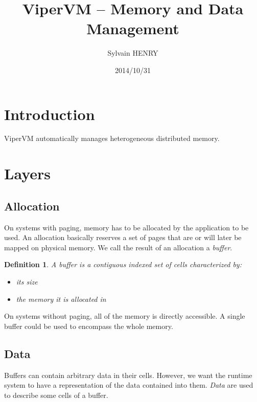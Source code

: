 \documentclass[twocolumn]{article}
\begin{document}
\title{ViperVM -- Memory and Data Management}
\author{Sylvain HENRY}
\date{2014/10/31}

\newtheorem{defin}{Definition}

\maketitle

\section{Introduction}

ViperVM automatically manages heterogeneous distributed memory.

\section{Layers}

\subsection{Allocation}

On systems with paging, memory has to be allocated by the application to be
used. An allocation basically reserves a set of pages that are or will later be
mapped on physical memory. We call the result of an allocation a \emph{buffer}.

\begin{defin}
A \emph{buffer} is a contiguous indexed set of cells characterized by:
\begin{itemize}
   \item its size
   \item the memory it is allocated in
\end{itemize}
\end{defin}

On systems without paging, all of the memory is directly accessible. A single
buffer could be used to encompass the whole memory.

\subsection{Data}

Buffers can contain arbitrary data in their cells. However, we want the runtime
system to have a representation of the data contained into them. \emph{Data} are
used to describe some cells of a buffer.
\end{document}
